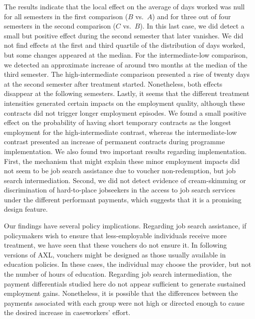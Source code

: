 \documentclass[
  11pt]{article}
\begin{document}
The results indicate that the local effect on the average of days worked
was null for all semesters in the first comparison (\(B\) vs.~\(A\)) and
for three out of four semesters in the second comparison (\(C\)
vs.~\(B\)). In this last case, we did detect a small but positive effect
during the second semester that later vanishes. We did not find effects
at the first and third quartile of the distribution of days worked, but
some changes appeared at the median. For the intermediate-low
comparison, we detected an approximate increase of around two months at
the median of the third semester. The high-intermediate comparison
presented a rise of twenty days at the second semester after treatment
started. Nonetheless, both effects disappear at the following semesters.
Lastly, it seems that the different treatment intensities generated
certain impacts on the employment quality, although these contracts did
not trigger longer employment episodes. We found a small positive effect
on the probability of having short temporary contracts as the longest
employment for the high-intermediate contrast, whereas the
intermediate-low contrast presented an increase of permanent contracts
during programme implementation. We also found two important results
regarding implementation. First, the mechanism that might explain these
minor employment impacts did not seem to be job search assistance due to
voucher non-redemption, but job search intermediation. Second, we did
not detect evidence of cream-skimming or discrimination of hard-to-place
jobseekers in the access to job search services under the different
performant payments, which suggests that it is a promising design
feature.

Our findings have several policy implications. Regarding job search
assistance, if policymakers wish to ensure that less-employable
individuals receive more treatment, we have seen that these vouchers do
not ensure it. In following versions of AXL, vouchers might be designed
as those usually available in education policies. In these cases, the
individual may choose the provider, but not the number of hours of
education. Regarding job search intermediation, the payment
differentials studied here do not appear sufficient to generate
sustained employment gains. Nonetheless, it is possible that the
differences between the payments associated with each group were not
high or directed enough to cause the desired increase in caseworkers'
effort.
\end{document}
